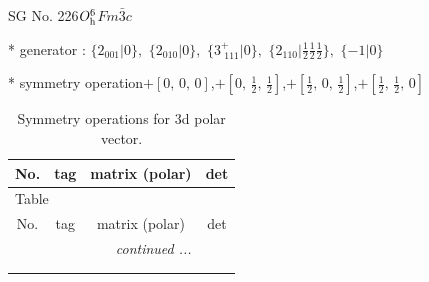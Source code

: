 \documentclass[fleqn,8pt]{jsarticle}
\begin{document}
\setcounter{MaxMatrixCols}{32}

\renewcommand{\tablename}{Table~}
\renewcommand{\figurename}{Figure~}
\begin{center}
\LARGE
SG No. 226\quad$O_{\rm h}^{6}$\quad$Fm\bar{3}c$\quad[ cubic ]
\end{center}

* generator : $\{2{}_{001}|0\},\,\,\{2{}_{010}|0\},\,\,\{3^{+}_{\,\,111}|0\},\,\,\{2{}_{110}|\frac{1}{2} \frac{1}{2} \frac{1}{2}\},\,\,\{-1|0\}$

* symmetry operation\quad$+\left[ 0,\, 0,\, 0 \right]$,\quad $+\left[ 0,\, \frac{1}{2},\, \frac{1}{2} \right]$,\quad $+\left[ \frac{1}{2},\, 0,\, \frac{1}{2} \right]$,\quad $+\left[ \frac{1}{2},\, \frac{1}{2},\, 0 \right]$
\renewcommand{\arraystretch}{1.3}
\begin{longtable}{cccc}
\caption{Symmetry operations for 3d polar vector.}
 \\
 \hline \hline
No. & tag & matrix (polar) & det \\ \hline \endfirsthead

\multicolumn{3}{l}{\tablename\ \thetable{}} \\
 \hline \hline
No. & tag & matrix (polar) & det \\ \hline \endhead

 \hline \hline
\multicolumn{3}{r}{\footnotesize\it continued ...} \\ \endfoot

 \hline \hline
\multicolumn{3}{r}{} \\ \endlastfoot


\end{longtable}
\end{document}
